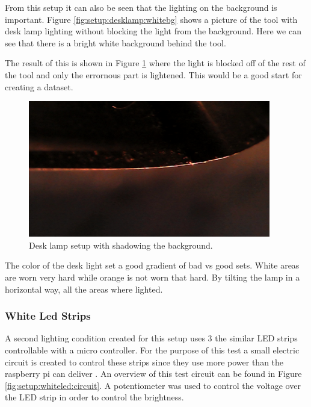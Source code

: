 From this setup it can also be seen that the lighting on the background is important. Figure \ref{fig:setup:desklamp:whitebg} shows a picture of the tool with desk lamp lighting without blocking the light from the background. Here we can see that there is a bright white background behind the tool. 

The result of this is shown in Figure \ref{fig:setup:desklamp:blackbg} where the light is blocked off of the rest of the tool and only the errornous part is lightened. This would be a good start for creating a dataset.

\begin{figure}[hbtp]
\centering
\includegraphics[width=4.166667in, keepaspectratio=true]{./fig/Camera_setup/Light/Desk_Lamp_Test/eerste-opstelling_donkere_achtergrond2.jpg}
\caption{Desk lamp setup with shadowing the background.}
\label{fig:setup:desklamp:blackbg}
\end{figure}

The color of the desk light set a good gradient of bad vs good sets. White areas are worn very hard while orange is not worn that hard. By tilting the lamp in a horizontal way, all the areas where lighted. 

		\subsubsection{White Led Strips}

		A second lighting condition created for this setup uses 3 the similar LED strips controllable with a micro controller. 
		For the purpose of this test a small electric circuit is created to control these strips since they use more power than the raspberry pi can deliver \citep{rpi}. An overview of this test circuit can be found in Figure \ref{fig:setup:whiteled:circuit}. A potentiometer was used to control the voltage over the LED strip in order to control the brightness. 

